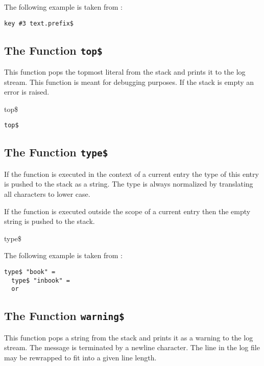 The following example is taken from :

\begin{lstlisting}[language=bst]
  key #3 text.prefix$
\end{lstlisting}


\subsection{The Function \texttt{top\$}}%

This function pops the topmost literal from the stack and prints it
to the log stream. This function is meant for debugging purposes.
If the stack is empty an error is raised.

\begin{BstFunction}{top\$}
\end{BstFunction}

\begin{lstlisting}[language=bst]
  top$
\end{lstlisting}


\subsection{The Function \texttt{type\$}}%

If the function is executed in the context of a current entry the type
of this entry is pushed to the stack as a string. The type is always
normalized by translating all characters to lower case.

If the function is executed outside the scope of a current entry then
the empty string is pushed to the stack.

\begin{BstFunction}{type\$}
\end{BstFunction}

The following example is taken from :

\begin{lstlisting}[language=bst]
  type$ "book" =
  type$ "inbook" =
  or
\end{lstlisting}\fctIndex{=}


\subsection{The Function \texttt{warning\$}}%

This function pops a string from the stack and prints it as a warning
to the log stream. The message is terminated by a newline character.
The line in the log file may be rewrapped to fit into a given line
length.


